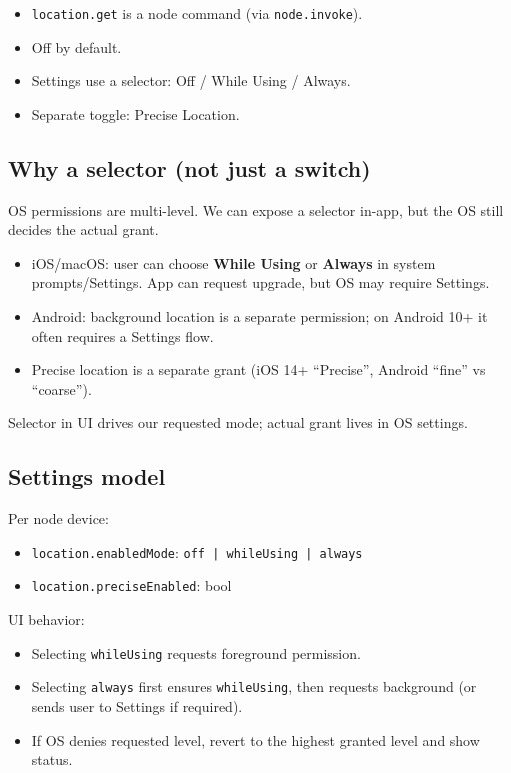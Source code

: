 \begin{itemize}
  \item \texttt{location.get} is a node command (via \texttt{node.invoke}).
  \item Off by default.
  \item Settings use a selector: Off / While Using / Always.
  \item Separate toggle: Precise Location.
\end{itemize}


\subsection{Why a selector (not just a switch)}


OS permissions are multi-level. We can expose a selector in-app, but the OS still decides the actual grant.

\begin{itemize}
  \item iOS/macOS: user can choose \textbf{While Using} or \textbf{Always} in system prompts/Settings. App can request upgrade, but OS may require Settings.
  \item Android: background location is a separate permission; on Android 10+ it often requires a Settings flow.
  \item Precise location is a separate grant (iOS 14+ “Precise”, Android “fine” vs “coarse”).
\end{itemize}


Selector in UI drives our requested mode; actual grant lives in OS settings.

\subsection{Settings model}


Per node device:

\begin{itemize}
  \item \texttt{location.enabledMode}: \texttt{off | whileUsing | always}
  \item \texttt{location.preciseEnabled}: bool
\end{itemize}


UI behavior:

\begin{itemize}
  \item Selecting \texttt{whileUsing} requests foreground permission.
  \item Selecting \texttt{always} first ensures \texttt{whileUsing}, then requests background (or sends user to Settings if required).
  \item If OS denies requested level, revert to the highest granted level and show status.
\end{itemize}


